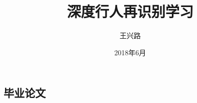 \documentclass[fangfont=AdobeFangsongStd-Regular,heifont=AdobeHeitiStd-Regular]{zju-thesis}
\title{深度行人再识别学习}{浙江大学本科生毕业论文}
\author{王兴路}{3140102282}
\date{2018年6月}
\begin{document}




	



\tableofcontents

\begin{refsection}
	\part{毕业论文}
	
\end{refsection}
\end{document}
